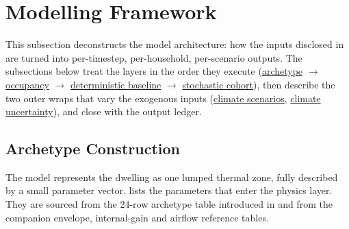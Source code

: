 




\pagebreak
\section{Modelling Framework}
\label{sec:modelling_framework}

This subsection deconstructs the model architecture: how the inputs disclosed in  are turned into per-timestep, per-household, per-scenario outputs. 
\newline The subsections below treat the layers in the order they execute (\hyperref[sec:archetypeConstruction]{archetype} $\to$ \hyperref[sec:occupancyStateModel]{occupancy} $\to$ \hyperref[sec:deterministicBaselineDemandModel]{deterministic baseline} $\to$ \hyperref[sec:stochasticScenarioGeneration]{stochastic cohort}), then describe the two outer wraps that vary the exogenous inputs (\hyperref[sec:climateScenariosFramework]{climate scenarios}, \hyperref[sec:climateUncertainty]{climate uncertainty}), and close with the output ledger.


\subsection{Archetype Construction}
\label{sec:archetypeConstruction}

The model represents the dwelling as one lumped thermal zone, fully described by a small parameter vector.  lists the parameters that enter the physics layer. They are sourced from the \num{24}-row archetype table introduced in  and from the companion envelope, internal-gain and airflow reference tables.

